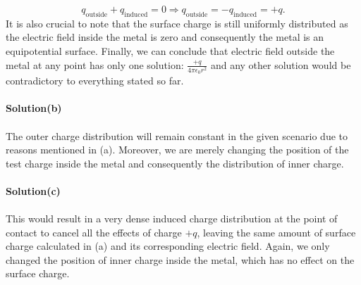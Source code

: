 \documentclass{article}
\begin{document}
\[q_{\text{outside}}+q_{\text{induced}}=0\Rightarrow q_{\text{outside}}=-q_{\text{induced}}=+q.\]
It is also crucial to note that the surface charge is still uniformly distributed as the electric field inside the metal is zero and consequently the metal is an equipotential surface. Finally, we can conclude that electric field outside the metal at any point has only one solution: $\frac{+q}{4\pi\epsilon_0r^2}$ and any other solution would be contradictory to everything stated so far.
\\
\\\textbf{Solution(b)}
\\
\\The outer charge distribution will remain constant in the given scenario due to reasons mentioned in (a). Moreover, we are merely changing the position of the test charge inside the metal and consequently the distribution of inner charge.
\\
\\\textbf{Solution(c)}
\\
\\This would result in a very dense induced charge distribution at the point of contact to cancel all the effects of charge $+q$, leaving the same amount of surface charge calculated in (a) and its corresponding electric field. Again, we only changed the position of inner charge inside the metal, which has no effect on the surface charge.  
\end{document}

